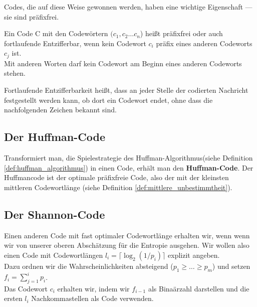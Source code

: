 Codes, die auf diese Weise gewonnen werden, haben eine wichtige
Eigenschaft --- sie sind präfixfrei.
\begin{definition}[Präfixfrei]
Ein Code C mit den Codewörtern $(c_1, c_2 \dots c_n$) heißt präfixfrei oder auch fortlaufende Entzifferbar, wenn kein Codewort $c_i$ präfix eines anderen Codeworts $c_j$ ist.\\
Mit anderen Worten darf kein Codewort am Beginn eines anderen Codeworts stehen.
\end{definition}

Fortlaufende Entzifferbarkeit heißt, dass an jeder Stelle der
codierten Nachricht festgestellt werden kann, ob dort ein Codewort endet,
ohne dass die nachfolgenden Zeichen bekannt sind.

\subsection{Der Huffman-Code}
Transformiert man, die Spielestrategie des Huffman-Algorithmus(siehe Definition \ref{def:huffman_algorithmus}) in einen Code, erhält man den \textbf{Huffman-Code}.
Der Huffmancode ist der optimale präfixfreie Code, also der 
mit der kleinsten mittleren Codewortlänge (siehe Definition \ref{def:mittlere_unbestimmtheit}).

\subsection{Der Shannon-Code}
Einen anderen Code mit fast optimaler Codewortlänge erhalten wir, wenn
wenn wir von unserer oberen Abschätzung für die Entropie ausgehen. 
Wir wollen also einen Code mit Codewortlängen $l_i=\lceil\log_2(1/p_i)\rceil$
explizit angeben. \\
Dazu ordnen wir die Wahrscheinlichkeiten absteigend
($p_1\ge\dots\ge p_m$) und setzen $f_i=\sum_{j=1}^ip_i$. \\
Das Codewort
$c_i$ erhalten wir, indem wir $f_{i-1}$ als Binaärzahl darstellen und
die ersten $l_i$ Nachkommastellen als Code verwenden. \\

